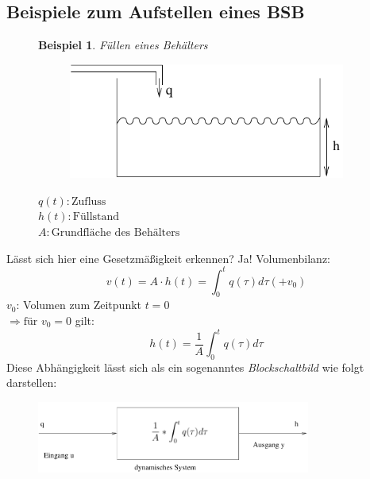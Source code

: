 \message{ !name(Mitschrieb_SysRegel.tex)}\documentclass[12pt,a4paper,ngerman]{scrartcl}
\newtheorem{bsp}{Beispiel}[section] %
\begin{document}
\subsection{Beispiele zum Aufstellen eines BSB}
\begin{figure}[H]%
\begin{bsp}
Füllen eines Behälters
\end{bsp}

\begin{minipage}{0.4\linewidth} 
 \begin{figure}[H]
  \includegraphics[width=\linewidth]{sysregel_bsp_1} 
  \end{figure}
\end{minipage}
\begin{minipage}{.6\linewidth}
$q(t):\text{Zufluss}$\\
$h(t):\text{Füllstand}$\\
$A:\text{Grundfläche des Behälters}$
\end{minipage}
\end{figure}
Lässt sich hier eine Gesetzmäßigkeit erkennen? Ja! Volumenbilanz:
\begin{equation*}
 v(t)= A \cdot h(t)=\int_0^t{q(\tau)d\tau}(+v_0) 
\end{equation*}
$v_0$: Volumen zum Zeitpunkt $t=0$ \\$\Rightarrow \text{für } v_0 = 0$ gilt:
\begin{equation*}
h(t)=\frac{1}{A}\int_0^t{q(\tau)d\tau}
\end{equation*}
Diese Abhängigkeit lässt sich als ein sogenanntes \emph{Blockschaltbild} wie folgt darstellen:
\begin{figure}[H]
\includegraphics[width=9cm]{sysregel_bsb1}
\end{figure}
\end{document}
